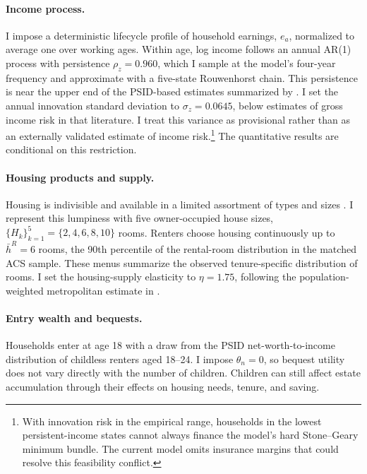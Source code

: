 \documentclass[11pt]{article}
\begin{document}
\paragraph{Income process.}
I impose a deterministic lifecycle profile of household earnings, $e_a$,
normalized to average one over working ages. Within age, log income follows an
annual AR(1) process with persistence $\rho_z=0.960$, which I sample at the
model's four-year frequency and approximate with a five-state Rouwenhorst
chain. This persistence is near the upper end of the PSID-based estimates
summarized by \citet{sommerImplicationsUSTax2018}. I set the annual innovation
standard deviation to $\sigma_z=0.0645$, below estimates of gross income risk
in that literature. I treat this variance as provisional rather than as an
externally validated estimate of income risk.\footnote{With innovation risk in
the empirical range, households in the lowest persistent-income states cannot
always finance the model's hard Stone--Geary minimum bundle. The current model
omits insurance margins that could resolve this feasibility conflict.}
The quantitative results are conditional on this restriction.

\paragraph{Housing products and supply.}
Housing is indivisible and available in a limited assortment of types and
sizes \citep{davisHousingFinanceMacroeconomy2015}. I represent this lumpiness
with five owner-occupied house sizes,
$\{H_k\}_{k=1}^5=\{2,4,6,8,10\}$ rooms. Renters choose housing continuously up
to $\bar h^R=6$ rooms, the 90th percentile of the rental-room distribution in
the matched ACS sample. These menus summarize the observed tenure-specific
distribution of rooms. I set the housing-supply elasticity to $\eta=1.75$,
following the population-weighted metropolitan estimate in
\citet{saizGeographicDeterminantsHousing2010}.

\paragraph{Entry wealth and bequests.}
Households enter at age 18 with a draw from the PSID net-worth-to-income
distribution of childless renters aged 18--24. I impose $\theta_n=0$, so
bequest utility does not vary directly with the number of children. Children
can still affect estate accumulation through their effects on housing needs,
tenure, and saving.
\end{document}
